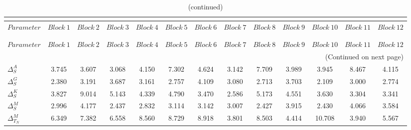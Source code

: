  
\begin{center}
\begin{longtable}{lcccccccccccc} 
\caption{MCMC Inefficiency factors per block}\\
 \label{Table:MCMC_inefficiency_factors}\\
\toprule 
$Parameter             $	 & 	 $     Block~1$	 & 	 $     Block~2$	 & 	 $     Block~3$	 & 	 $     Block~4$	 & 	 $     Block~5$	 & 	 $     Block~6$	 & 	 $     Block~7$	 & 	 $     Block~8$	 & 	 $     Block~9$	 & 	 $    Block~10$	 & 	 $    Block~11$	 & 	 $    Block~12$\\
\midrule \endfirsthead 
\caption{(continued)}\\
 \toprule \\ 
$Parameter             $	 & 	 $     Block~1$	 & 	 $     Block~2$	 & 	 $     Block~3$	 & 	 $     Block~4$	 & 	 $     Block~5$	 & 	 $     Block~6$	 & 	 $     Block~7$	 & 	 $     Block~8$	 & 	 $     Block~9$	 & 	 $    Block~10$	 & 	 $    Block~11$	 & 	 $    Block~12$\\
\midrule \endhead 
\midrule \multicolumn{13}{r}{(Continued on next page)} \\ \bottomrule \endfoot 
\bottomrule \endlastfoot 
$ {\Delta^{A}_{S}}     $	 & 	       3.745	 & 	       3.607	 & 	       3.068	 & 	       4.150	 & 	       7.302	 & 	       4.624	 & 	       3.142	 & 	       7.709	 & 	       3.989	 & 	       3.945	 & 	       8.467	 & 	       4.115 \\ 
$ {\Delta^{G}_{S}}     $	 & 	       2.380	 & 	       3.191	 & 	       3.687	 & 	       3.161	 & 	       2.757	 & 	       4.109	 & 	       3.080	 & 	       2.713	 & 	       3.703	 & 	       2.109	 & 	       3.000	 & 	       2.774 \\ 
$ {\Delta^{K}_{S}}     $	 & 	       3.827	 & 	       9.014	 & 	       5.143	 & 	       4.339	 & 	       4.790	 & 	       3.470	 & 	       2.586	 & 	       5.173	 & 	       4.551	 & 	       3.630	 & 	       3.304	 & 	       3.341 \\ 
$ {\Delta^{M}_{S}}     $	 & 	       2.996	 & 	       4.177	 & 	       2.437	 & 	       2.832	 & 	       3.114	 & 	       3.142	 & 	       3.007	 & 	       2.427	 & 	       3.915	 & 	       2.430	 & 	       4.066	 & 	       3.584 \\ 
$ {\Delta^{M}_{T_N}}   $	 & 	       6.349	 & 	       7.382	 & 	       6.558	 & 	       8.560	 & 	       8.729	 & 	       8.918	 & 	       3.801	 & 	       8.503	 & 	       4.414	 & 	      10.708	 & 	       3.940	 & 	       5.567 \\ 

\end{longtable}
\end{center}

